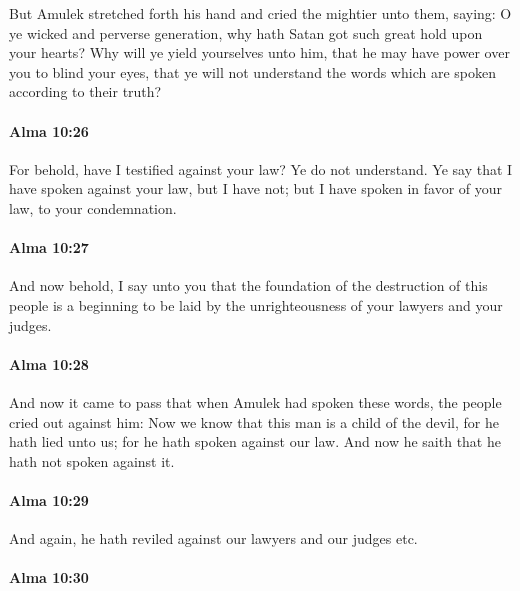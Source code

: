 			But Amulek stretched forth his hand and cried the mightier unto them, saying:
			O ye wicked and perverse generation,
			why hath Satan got such great hold upon your hearts?
			Why will ye yield yourselves unto him,
			that he may have power over you to blind your eyes,
			that ye will not understand the words which are spoken according to their truth?

		\paragraph{Alma 10:26} %
			\label{ALMA-10-26}

			For behold, have I testified against your law?
			Ye do not understand.
			Ye say that I have spoken against your law,
			but I have not;
			but I have spoken in favor of your law,
			to your condemnation.

		\paragraph{Alma 10:27} %
			\label{ALMA-10-27}

			And now behold, I say unto you
			that the foundation of the destruction of this people is a beginning to be laid
			by the unrighteousness of your lawyers and your judges.

		\paragraph{Alma 10:28} %
			\label{ALMA-10-28}

			And now it came to pass that when Amulek had spoken these words,
			the people cried out against him:
			Now we know that this man is a child of the devil,
			for he hath lied unto us;
			for he hath spoken against our law.
			And now he saith that he hath not spoken against it.

		\paragraph{Alma 10:29} %
			\label{ALMA-10-29}

			And again, he hath reviled against our lawyers and our judges etc.

		\paragraph{Alma 10:30} %
			\label{ALMA-10-30}

